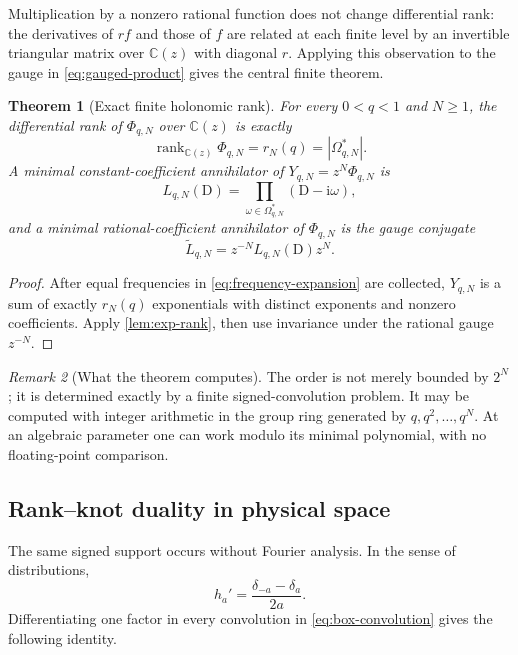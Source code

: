 \documentclass[11pt]{article}
\numberwithin{equation}{section}
\newtheorem{theorem}{Theorem}[section]
\theoremstyle{definition}
\theoremstyle{remark}
\newtheorem{remark}[theorem]{Remark}
\DeclareMathOperator{\rank}{rank}
\newcommand{\C}{\mathbb C}
\newcommand{\ii}{\mathrm i}
\newcommand{\D}{\mathrm D}
\newcommand{\abs}[1]{\left\lvert#1\right\rvert}
\begin{document}
Multiplication by a nonzero rational function does not change differential
rank: the derivatives of $rf$ and those of $f$ are related at each finite level
by an invertible triangular matrix over $\C(z)$ with diagonal $r$.  Applying
this observation to the gauge in \eqref{eq:gauged-product} gives the central
finite theorem.

\begin{theorem}[Exact finite holonomic rank]
\label{thm:finite-rank}
For every $0<q<1$ and $N\ge1$, the differential rank of
$\Phi_{q,N}$ over $\C(z)$ is exactly
\begin{equation}
 \boxed{\rank_{\C(z)}\Phi_{q,N}=r_N(q)=\abs{\Omega^*_{q,N}}.}
 \label{eq:rank-support}
\end{equation}
A minimal constant-coefficient annihilator of $Y_{q,N}=z^N\Phi_{q,N}$ is
\begin{equation}
 L_{q,N}(\D)=\prod_{\omega\in\Omega^*_{q,N}}(\D-\ii\omega),
 \label{eq:minimal-LqN}
\end{equation}
and a minimal rational-coefficient annihilator of $\Phi_{q,N}$ is the gauge
conjugate
\begin{equation}
 \widetilde L_{q,N}=z^{-N}L_{q,N}(\D)z^N.
 \label{eq:gauge-conjugate}
\end{equation}
\end{theorem}
\begin{proof}
After equal frequencies in \eqref{eq:frequency-expansion} are collected,
$Y_{q,N}$ is a sum of exactly $r_N(q)$ exponentials with distinct exponents and
nonzero coefficients.  Apply \cref{lem:exp-rank}, then use invariance under the
rational gauge $z^{-N}$.
\end{proof}

\begin{remark}[What the theorem computes]
The order is not merely bounded by $2^N$; it is determined exactly by a finite
signed-convolution problem.  It may be computed with integer arithmetic in the
group ring generated by $q,q^2,\ldots,q^N$.  At an algebraic parameter one can
work modulo its minimal polynomial, with no floating-point comparison.
\end{remark}

\subsection{Rank--knot duality in physical space}

The same signed support occurs without Fourier analysis.  In the sense of
distributions,
\begin{equation}
 h_a'=\frac{\delta_{-a}-\delta_a}{2a}.
 \label{eq:box-derivative}
\end{equation}
Differentiating one factor in every convolution in \eqref{eq:box-convolution}
gives the following identity.
\end{document}

